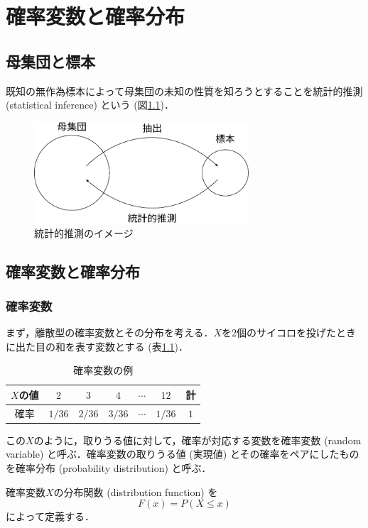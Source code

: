 \documentclass{jsreport}
\begin{document}
\chapter{確率変数と確率分布}
\section{母集団と標本}
既知の無作為標本によって母集団の未知の性質を知ろうとすることを統計的推測 (statistical inference) という (図\ref{fig:inf})．
\begin{figure}[htb]
  \centering
  \includegraphics[clip, width=8cm]{../figure/infer.pdf}
  \caption{統計的推測のイメージ}
  \label{fig:inf}
\end{figure}

\section{確率変数と確率分布}
\subsection{確率変数}
まず，離散型の確率変数とその分布を考える．$X$を2個のサイコロを投げたときに出た目の和を表す変数とする (表\ref{tab:ex_pr})．
\begin{table}[htb]
  \centering
  \caption{確率変数の例}
  \begin{tabular}{c|ccccc|c}
    $X$の値 & $2$ & $3$ & $4$ & $\cdots$ & $12$ & 計 \\ \hline
    確率 & $1/36$ & $2/36$ & $3/36$ & $\cdots$ & $1/36$ & $1$ \\ \hline
  \end{tabular}
  \label{tab:ex_pr}
\end{table}

この$X$のように，取りうる値に対して，確率が対応する変数を確率変数 (random variable) と呼ぶ．確率変数の取りうる値 (実現値) とその確率をペアにしたものを確率分布 (probability distribution) と呼ぶ．

\begin{screen}
  \begin{defi}[分布関数]
    確率変数$X$の分布関数 (distribution function) を
    \begin{equation}
      F(x) = P(X \leq x) \nonumber
    \end{equation}
    によって定義する．
  \end{defi}
\end{screen}
\end{document}
